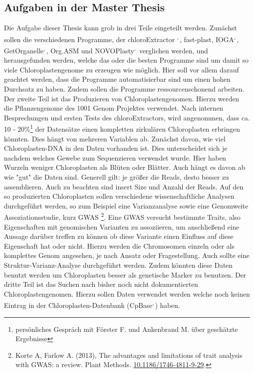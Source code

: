 \documentclass{scrartcl}
\begin{document}
\subsection{Aufgaben in der Master Thesis}
\label{sec-2-7}
Die Aufgabe dieser Thesis kann grob in drei Teile eingeteilt werden. Zunächst sollen die verschiedenen Programme, der chloroExtractor \footnotemark[16]{}\textsuperscript{,}\,\footnotemark[17]{}, fast-plast\footnotemark[25]{}, IOGA\footnotemark[34]{}\textsuperscript{,}\,\footnotemark[35]{}, GetOrganelle\footnotemark[31]{}\textsuperscript{,}\,\footnotemark[32]{},
Org.ASM\footnotemark[28]{} und NOVOPlasty\footnotemark[26]{}\textsuperscript{,}\,\footnotemark[27]{} verglichen werden, und herausgefunden werden, welche das oder die besten Programme sind um damit so viele Chloroplastengenome zu erzeugen wie 
möglich. Hier soll vor allem darauf geachtet werden, dass die Programme automatisierbar sind um einen hohen Durchsatz zu haben. Zudem sollen die Programme ressourcenschonend arbeiten. 
Der zweite Teil ist das Produzieren von Chloroplastengenomen. Hierzu werden die Pflanzengenome des 1001 Genom Projektes verwendet. Nach internen Besprechungen und ersten Tests des chloroExtractors,
wird angenommen, dass ca. 10 - 20\%\footnote{persönliches Gespräch mit Förster F. und Ankenbrand M. über geschätzte Ergebnisse} der Datensätze einen kompletten zirkulären Chloroplasten erbringen könnten. Dies hängt von mehreren Variablen ab. Zunächst davon, wie viel Chloroplasten-DNA in den Daten vorhanden ist. Dies
unterscheidet sich je nachdem welches Gewebe zum Sequenzieren verwendet wurde. Hier haben Wurzeln weniger Chloroplasten als Blüten oder Blätter. Auch hängt es davon ab wie "gut" die Daten sind. Generell gilt: je 
größer die Reads, desto besser zu assemblieren. Auch zu beachten sind insert Size und Anzahl der Reads.
Auf den so produzierten Chloroplasten sollen verschiedene wissenschaftliche Analysen durchgeführt werden, so zum Beispiel eine Varianzanalyse sowie eine Genomweite Assoziationsstudie, kurz GWAS \footnote{Korte A, Farlow A. (2013), The advantages and limitations of trait analysis with GWAS: a review. Plant Methods. \url{10.1186/1746-4811-9-29}.}.
Eine GWAS versucht bestimmte Traits, also Eigenschaften mit genomischen Varianten zu assoziieren, um anschließend eine Aussage darüber treffen zu können ob diese Variante einen Einfluss auf diese 
Eigenschaft hat oder nicht. Hierzu werden die Chromosomen einzeln oder als komplettes Genom angesehen, je nach Ansatz oder Fragestellung.
Auch sollte eine Struktur-Varianz-Analyse durchgeführt werden. Zudem könnten diese Daten benutzt werden um Chloroplasten besser als genetische Marker zu benutzen. 
Der dritte Teil ist das Suchen nach bisher noch nicht dokumentierten Chloroplastengenomen. Hierzu sollen Daten verwendet werden welche noch keinen Eintrag in der Chloroplasten-Datenbank (CpBase\footnotemark[39]{}\textsuperscript{,}\,\footnotemark[40]{}) haben.
\end{document}

